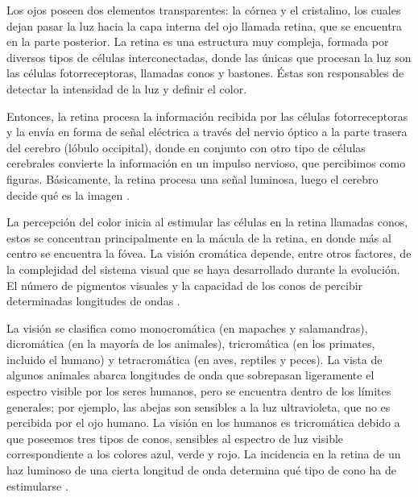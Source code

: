 \documentclass[10pt]{article}
\begin{document}
Los ojos poseen dos elementos transparentes: la córnea y el cristalino, los cuales dejan pasar la luz hacia la capa interna del ojo llamada retina, que se encuentra en la parte posterior. La retina es una estructura muy compleja, formada por diversos tipos de células interconectadas, donde las únicas que procesan la luz son las células fotorreceptoras, llamadas conos y bastones. Éstas son responsables de detectar la intensidad de la luz y definir el color.

\setlength{\parskip}{2mm}

Entonces, la retina procesa la información recibida por las células fotorreceptoras y la envía en forma de señal eléctrica a través del nervio óptico a la parte trasera del cerebro (lóbulo occipital), donde en conjunto con otro tipo de células cerebrales convierte la información en un impulso nervioso, que percibimos como figuras. Básicamente, la retina procesa una señal luminosa, luego el cerebro decide qué es la imagen \cite{IEEEreferencias:Ref12}.

\setlength{\parskip}{2mm}

La percepción del color inicia al estimular las células en la retina llamadas conos, estos  se concentran principalmente en la mácula de la retina, en donde más al centro se encuentra la fóvea. La visión cromática depende, entre otros factores, de la complejidad del sistema visual que se haya desarrollado durante la evolución. El número de pigmentos visuales y la capacidad de los conos de percibir determinadas longitudes de ondas \cite{IEEEreferencias:Ref12}.

\setlength{\parskip}{2mm}

La visión se clasifica como monocromática (en mapaches y salamandras), dicromática (en la mayoría de los animales), tricromática (en los primates, incluido el humano) y tetracromática (en aves, reptiles y peces). La vista de algunos animales abarca longitudes de onda que sobrepasan ligeramente el espectro visible por los seres humanos, pero se encuentra dentro de los límites generales; por ejemplo, las abejas son sensibles a la luz ultravioleta, que no es percibida por el ojo humano. La visión en los humanos es tricromática debido a que poseemos tres tipos de conos, sensibles al espectro de luz visible correspondiente a los colores azul, verde y rojo. La incidencia en la retina de un haz luminoso de una cierta longitud de onda determina qué tipo de cono ha de estimularse \cite{IEEEreferencias:Ref12}.

\setlength{\parskip}{2mm}
\end{document}
